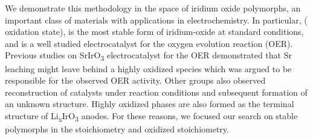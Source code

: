We demonstrate this methodology in the space of iridium oxide polymorphs,
an important class of materials with applications in electrochemistry.
%
In particular, \rIrOtwo ( oxidation state), is the most stable form of iridium-oxide at standard conditions,
and is a well studied electrocatalyst for the oxygen evolution reaction (OER).
\cite{Seitz2016,Lee2012a,McCrory2015,Trotochaud2012,Danilovic2014,Carmo2013,Miles1978,Beni1979}
%
Previous studies on SrIrO\textsubscript{3} electrocatalyst for the OER demonstrated that Sr leaching might leave behind a highly oxidized  species which was argued to be responsible for the observed OER activity.
\cite{Seitz2016}
%
Other groups also observed reconstruction of \IrOx catalysts under reaction conditions and subsequent formation of an unknown structure. \cite{Pearce2017}
%
Highly oxidized \IrOthree phases are also formed as the terminal structure of Li\textsubscript{x}IrO\textsubscript{3} anodes.\cite{Pearce2017}
%
For these reasons, we focused our search on stable polymorphs in the \IrOtwo stoichiometry and  oxidized \IrOthree stoichiometry.
%
%


